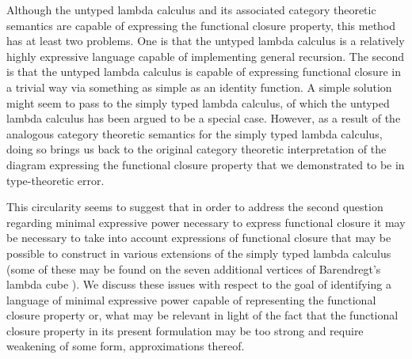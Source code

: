 Although the untyped lambda calculus and its associated category theoretic semantics are capable of expressing the functional closure property, this method has at least two problems. One is that the untyped lambda calculus is a relatively highly expressive language capable of implementing general recursion. The second is that the untyped lambda calculus is capable of expressing functional closure in a trivial way via something as simple as an identity function. A simple solution might seem to pass to the simply typed lambda calculus, of which the untyped lambda calculus has been argued to be a special case. However, as a result of the analogous category theoretic semantics for the simply typed lambda calculus, doing so brings us back to the original category theoretic interpretation of the diagram expressing the functional closure property that we demonstrated to be in type-theoretic error.

This circularity seems to suggest that in order to address the second question regarding minimal expressive power necessary to express functional closure it may be necessary to take into account expressions of functional closure that may be possible to construct in various extensions of the simply typed lambda calculus (some of these may be found on the seven additional vertices of Barendregt's lambda cube \cite{Barendregt1985}). We discuss these issues with respect to the goal of identifying a language of minimal expressive power capable of representing the functional closure property or, what may be relevant in light of the fact that the functional closure property in its present formulation may be too strong and require weakening of some form, approximations thereof.